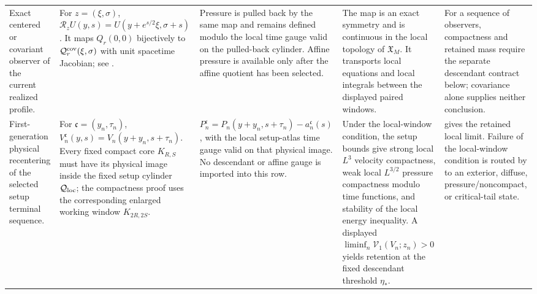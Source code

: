 \documentclass[11pt]{amsart}
\numberwithin{equation}{section}
\theoremstyle{plain}
\theoremstyle{definition}
\theoremstyle{remark}
\newcommand{\calR}{\mathcal R}
\newcommand{\Vel}{\mathcal V}
\begin{document}
\begin{longtable}{@{}L{0.15\textwidth}L{0.19\textwidth}L{0.20\textwidth}L{0.20\textwidth}L{0.18\textwidth}@{}}
Exact centered or covariant observer of the current realized profile. &
For \(z=(\xi,\sigma)\), \(\calR_zU(y,s)=
U(y+e^{s/2}\xi,\sigma+s)\).  It maps \(Q_r(0,0)\) bijectively to
\(\mathcal Q_r^{\rm cov}(\xi,\sigma)\) with unit spacetime Jacobian; see
. &
Pressure is pulled back by the same map and remains defined modulo the local
time gauge valid on the pulled-back cylinder.  Affine pressure is available
only after the affine quotient has been selected. &
The map is an exact symmetry and is continuous in the local topology of
\(\mathfrak X_M\).  It transports local equations and local integrals between
the displayed paired windows. &
For a sequence of observers, compactness and retained mass require the
separate descendant contract below; covariance alone supplies neither
conclusion.\\

First-generation physical recentering of the selected setup terminal
sequence. &
For \(\mathfrak c=(y_n,\tau_n)\),
\(V_n^{\mathfrak c}(y,s)=V_n(y+y_n,s+\tau_n)\).  Every fixed compact core
\(K_{R,S}\) must have its physical image inside the fixed setup cylinder
\(\mathcal Q_{\rm loc}\); the compactness proof uses the corresponding enlarged
working window \(K_{2R,2S}\). &
\(P_n^{\mathfrak c}=P_n(y+y_n,s+\tau_n)-a_n^{\mathfrak c}(s)\), with the local
setup-atlas time gauge valid on that physical image.  No descendant or affine
gauge is imported into this row. &
Under the local-window condition, the setup bounds give strong local
\(L^3\) velocity compactness, weak local \(L^{3/2}\) pressure compactness modulo
time functions, and stability of the local energy inequality.  A displayed
\(\liminf_n\Vel_1(V_n;z_n)>0\) yields retention at the fixed descendant
threshold \(\eta_*\). &
 gives the retained local
limit.  Failure of the local-window condition is routed by
 to an exterior, diffuse,
pressure/noncompact, or critical-tail state.\\


\end{longtable}
\end{document}
